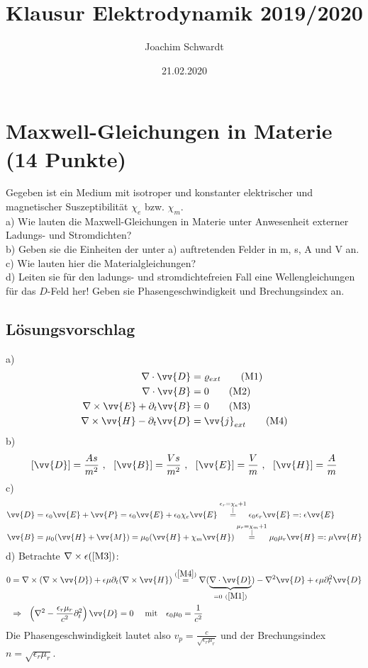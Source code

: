 \documentclass[a4paper,12pt]{article}
\begin{document}
\title{Klausur Elektrodynamik 2019/2020}
\author{Joachim Schwardt}
\date{21.02.2020}
\maketitle

\section{Maxwell-Gleichungen in Materie (14 Punkte)}
Gegeben ist ein Medium mit isotroper und konstanter elektrischer und magnetischer Suszeptibilität $\chi_e$ bzw. $\chi_m$.\\
a) Wie lauten die Maxwell-Gleichungen in Materie unter Anwesenheit externer Ladungs- und Stromdichten? \\
b) Geben sie die Einheiten der unter a) auftretenden Felder in m, s, A und V an.\\
c) Wie lauten hier die Materialgleichungen? \\
d) Leiten sie für den ladungs- und stromdichtefreien Fall eine Wellengleichungen für das $D$-Feld her! Geben sie Phasengeschwindigkeit und Brechungsindex an.
\subsection*{Lösungsvorschlag}
a) \begin{align*}
\nabla\cdot \vv{D}&=\varrho_{ext} \label{M1}\tag{M1}\\
\nabla\cdot \vv{B}&=0 \label{M2}\tag{M2}\\
\nabla\times\vv{E}+\partial_t \vv{B}&=0 \label{M3}\tag{M3}\\
\nabla\times\vv{H}-\partial_t \vv{D}&=\vv{j}_{ext}\label{M4}\tag{M4}
\end{align*}
b) $$\left[\vv{D}\right]=\frac{As}{m^2}\ ,\ \ \left[\vv{B}\right]=\frac{Vs}{m^2}\ ,\ \ \left[\vv{E}\right]=\frac{V}{m}\ ,\ \ \left[\vv{H}\right]=\frac{A}{m}$$
c) \begin{align*}
\vv{D}&=\epsilon_0\vv{E}+\vv{P}=\epsilon_0\vv{E}+\epsilon_0\chi_e\vv{E}\overset{\substack{\epsilon_r=\chi_e +1\\|}}{=}\epsilon_0\epsilon_r\vv{E}=:\epsilon\vv{E} \\
\vv{B}&=\mu_0(\vv{H}+\vv{M})=\mu_0(\vv{H}+\chi_m\vv{H})\overset{\substack{\mu_r=\chi_m +1\\|}}{=}\mu_0\mu_r\vv{H}=:\mu\vv{H}
\end{align*}
d) Betrachte $\nabla\times \epsilon(\ref{M3})$:
\begin{align*}
0&=\nabla\times(\nabla\times\vv{D})+\epsilon\mu\partial_t(\nabla\times\vv{H})\overset{(\ref{M4})}{=}\nabla(\underbrace{\nabla\cdot\vv{D}}_{=0\ (\ref{M1})})-\nabla^2\vv{D}+\epsilon\mu\partial_t^2\vv{D}\\
&\Rightarrow\ \ \left(\nabla^2-\frac{\epsilon_r\mu_r}{c^2}\partial_t^2\right)\vv{D}=0\ \ \ \ \textrm{mit }\ \ \epsilon_0\mu_0=\frac{1}{c^2}
\end{align*}
Die Phasengeschwindigkeit lautet also $v_{p}=\frac{c}{\sqrt{\epsilon_r\mu_r}}$ und der Brechungsindex $n=\sqrt{\epsilon_r\mu_r}$.
\end{document}
